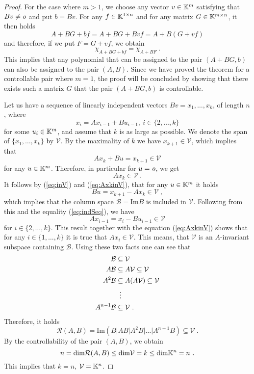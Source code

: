 \begin{proof}
    For the case where $m>1$, we choose any vector $v\in\mathbb{K}^m$ satisfying that $Bv\neq \textit{o}$ and put $b=Bv$. For any $f\in\mathbb{K}^{1\times n}$ and for any matrix $G\in\mathbb{K}^{m\times n}$, it then holds
    $${A+BG+bf}={A+BG+Bvf}={A+B(G+vf)}$$
    and therefore, if we put $F=G+vf$, we obtain 
    $$\chi_{A+BG+bf}=\chi_{A+BF}\ .$$
    This implies that any polynomial that can be assigned to the pair $(A+BG,b)$ can also be assigned to the pair $(A,B)$. Since we have proved the theorem for a controllable pair where $m=1$, the proof will be concluded by showing that there exists such a matrix $G$ that the pair $(A+BG,b)$ is controllable.
       
    Let us have a sequence of linearly independent vectors $Bv=x_1,\ldots,x_k$, of length $n$, where
    \begin{equation}
    \label{eq:indSeq}
        x_{i}=Ax_{i-1}+Bu_{i-1},\ i\in\{2,\ldots,k\}
    \end{equation}
    for some $u_i\in\mathbb{K}^m$, and assume that $k$ is as large as possible. We denote the span of $\{x_1,\ldots,x_k\}$ by $\mathcal{V}$. By the maximality of $k$ we have $x_{k+1}\in\mathcal{V}$, which implies that
    \begin{equation}
    \label{eq:inV}    
        Ax_k+Bu=x_{k+1}\in\mathcal{V}
    \end{equation}
    for any $u\in\mathbb{K}^m$. Therefore, in particular for $u=\textit{o}$, we get 
    \begin{equation}
    \label{eq:AxkinV}
        Ax_k\in\mathcal{V}\ .
    \end{equation}
    It follows by (\ref{eq:inV}) and (\ref{eq:AxkinV}), that for any $u\in\mathbb{K}^m$ it holds
    $$Bu=x_{k+1}-Ax_k\in\mathcal{V}\ ,$$
    which implies that the column space $\mathcal{B}=\text{Im}B$ is included in $\mathcal{V}$. Following from this and the equality (\ref{eq:indSeq}), we have 
    $$Ax_{i-1}=x_i-Bu_{i-1}\in\mathcal{V}$$
    for $i\in\{2,\ldots,k\}$. This result together with the equation (\ref{eq:AxkinV}) shows that for any $i\in\{1,\ldots,k\}$ it is true that $Ax_i\in\mathcal{V}$. This means, that $\mathcal{V}$ is an $A$-invariant subspace containing $\mathcal{B}$. Using these two facts one can see that 
    \begin{align*}
        \mathcal{B}&\subseteq\mathcal{V} \\
        A\mathcal{B}&\subseteq A\mathcal{V}\subseteq\mathcal{V} \\
        A^2\mathcal{B}&\subseteq A(A\mathcal{V})\subseteq\mathcal{V} \\
        &\vdotswithin{\subseteq} \\
        A^{n-1}\mathcal{B}&\subseteq\mathcal{V}
        \ .
    \end{align*}
    Therefore, it holds
    $$\mathcal{R}(A,B)=\text{Im}(B|AB|A^2B|\ldots|A^{n-1}B)\subseteq\mathcal{V}\ .$$
    By the controllability of the pair $(A,B)$, we obtain
    $$n=\text{dim}\mathcal{R}(A,B)\leq\text{dim}\mathcal{V}=k\leq\text{dim}\K^n=n\ .$$
    This implies that $k=n$, $\mathcal{V}=\mathbb{K}^n$.


\end{proof}
